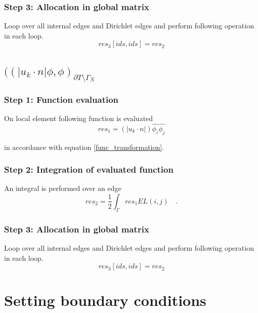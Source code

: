 \documentclass[a4paper,openany]{book}
\begin{document}
\subsubsection{Step 3: Allocation in global matrix}

Loop over all internal edges and Dirichlet edges and perform following operation in each loop.
\begin{equation}
res_3[ids,ids] = res_2
\end{equation}

\subsection{$((|u_k \cdot n| \phi,\phi)_{\partial T \setminus \Gamma_N}$}

\subsubsection{Step 1: Function evaluation}

On local element following function is evaluated 
\begin{equation}
res_1 = (|u_k \cdot n|) \hat{\phi_i} \hat{\phi_j}
\end{equation}

in accordance with equation \eqref{func_transformation}.\\

\subsubsection{Step 2: Integration of evaluated function}

An integral is performed over an edge
\begin{equation}
res_2 = \frac{1}{2} \int_{\Gamma} res_1 EL(i,j) \quad \textrm{.}
\end{equation}

\subsubsection{Step 3: Allocation in global matrix}

Loop over all internal edges and Dirichlet edges and perform following operation in each loop.
\begin{equation}
res_3[ids,ids] = res_2
\end{equation}

\section{Setting boundary conditions}
\end{document}
